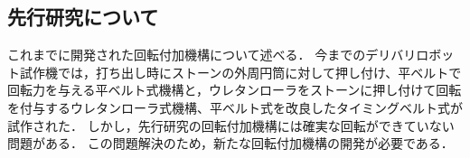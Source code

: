 \documentclass{classes/sice-si}
\begin{document}
\subsection{先行研究について}
これまでに開発された回転付加機構について述べる．
今までのデリバリロボット試作機では，打ち出し時にストーンの外周円筒に対して押し付け、平ベルトで回転力を与える平ベルト式機構と，ウレタンローラをストーンに押し付けて回転を付与するウレタンローラ式機構、平ベルト式を改良したタイミングベルト式が試作された．
しかし，先行研究の回転付加機構には確実な回転ができていない問題がある．
この問題解決のため，新たな回転付加機構の開発が必要である．
\end{document}
